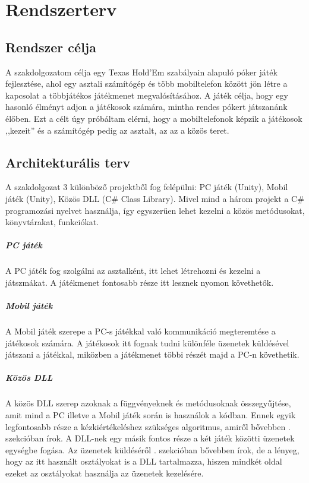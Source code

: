 \documentclass[]{thesis-ekf}
\theoremstyle{definition}
\theoremstyle{remark}
\begin{document}
\chapter{Rendszerterv}

\section{Rendszer célja}
A szakdolgozatom célja egy Texas Hold'Em szabályain alapuló póker játék fejlesztése, ahol egy asztali számítógép és több mobiltelefon között jön létre a kapcsolat a többjátékos játékmenet megvalósításához. A játék célja, hogy egy hasonló élményt adjon a játékosok számára, mintha rendes pókert játszanánk élőben. Ezt a célt úgy próbáltam elérni, hogy a mobiltelefonok képzik a játékosok ,,kezeit'' és a számítógép pedig az asztalt, az az a közös teret.

\section{Architekturális terv}
\label{sec-architecture}
A szakdolgozat 3 különböző projektből fog felépülni: PC játék (Unity), Mobil játék (Unity), Közös DLL (C\# Class Library). Mivel mind a három projekt a C\# programozási nyelvet használja, így egyszerűen lehet kezelni a közös metódusokat, könyvtárakat, funkciókat.

\paragraph{PC játék}

A PC játék fog szolgálni az asztalként, itt lehet létrehozni és kezelni a játszmákat. A játékmenet fontosabb része itt lesznek nyomon követhetők. 

\paragraph{Mobil játék}

A Mobil játék szerepe a PC-s játékkal való kommunikáció megteremtése a játékosok számára. A játékosok itt fognak tudni különféle üzenetek küldésével játszani a játékkal, miközben a játékmenet többi részét majd a PC-n követhetik.

\paragraph{Közös DLL}

A közös DLL szerep azoknak a függvényeknek és metódusoknak összegyűjtése, amit mind a PC illetve a Mobil játék során is használok a kódban. Ennek egyik legfontosabb része a kézkiértékeléshez szükséges algoritmus, amiről bővebben . szekcióban írok. A DLL-nek egy másik fontos része a két játék közötti üzenetek egységbe fogása. Az üzenetek küldéséről . szekcióban bővebben írok, de a lényeg, hogy az itt használt osztályokat is a DLL tartalmazza, hiszen mindkét oldal ezeket az osztályokat használja az üzenetek kezelésére.
\end{document}
